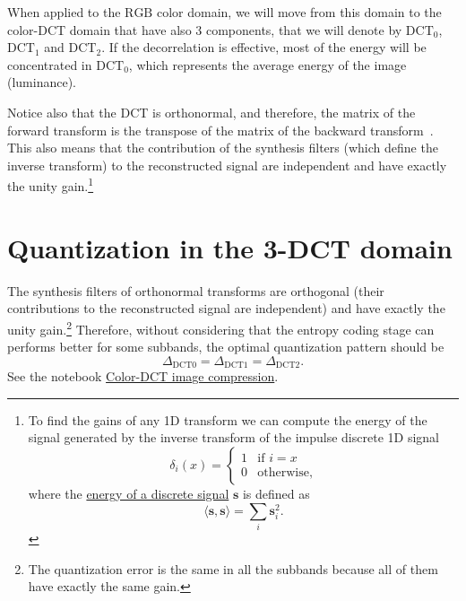 When applied to the $\text{RGB}$ color domain, we will move from this
domain to the color-DCT domain that have also 3 components, that we
will denote by $\text{DCT}_0$, $\text{DCT}_1$ and $\text{DCT}_2$. If
the decorrelation is effective, most of the energy will be
concentrated in $\text{DCT}_0$, which represents the average energy of
the image (luminance).

Notice also that the DCT is orthonormal, and therefore, the matrix of
the forward transform is the transpose of the matrix of the backward
transform~\cite{sayood2017introduction}. This also means that the
contribution of the synthesis filters (which define the inverse
transform) to the reconstructed signal are independent and have
exactly the unity gain.\footnote{To find the gains of any 1D transform
we can compute the energy of the signal generated by the inverse
transform of the impulse discrete 1D signal
\begin{equation}
  \delta_{i}(x) = 
  \left\{
  \begin{array}{ll}
    1 & \text{if $i=x$}\\
    0 & \text{otherwise},
  \end{array}
  \right.
\end{equation}
where the
\href{https://en.wikipedia.org/wiki/Energy_(signal_processing)}{energy
  of a discrete signal} ${\mathbf s}$ is defined as
\begin{equation}
  \langle {\mathbf s}, {\mathbf s} \rangle =  \sum_{i}{{\mathbf s}_i^2}.
\end{equation}
}

\section{Quantization in the 3-DCT domain}
The synthesis filters of orthonormal transforms are orthogonal (their
contributions to the reconstructed signal are independent) and have
exactly the unity gain.\footnote{The quantization error is the same in
all the subbands because all of them have exactly the same gain.}
Therefore, without considering that the entropy coding stage can
performs better for some subbands, the optimal quantization pattern
should be
\begin{equation}
  \Delta_{\text{DCT0}} = \Delta_{\text{DCT1}} = \Delta_{\text{DCT2}}.
\end{equation}
See the notebook
\href{https://github.com/vicente-gonzalez-ruiz/color_transforms/blob/main/docs/3DCT/notebooks/color-DCT_compression.ipynb}{Color-DCT
  image compression}.

